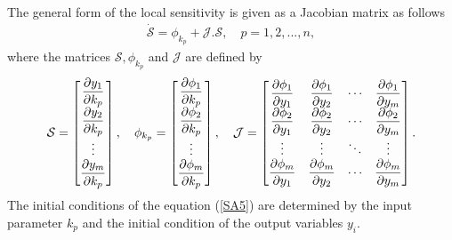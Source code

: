 \documentclass[a4paper,12pt]{article}
\begin{document}
\noindent The general form of the local sensitivity is given as a Jacobian matrix as follows
\begin{equation}  
\begin{array}{llll}
\dot{\mathcal{S}}=\phi_{k_{p}}+\mathcal{J} . \mathcal{S}, \quad p=1,2,...,n,
\end{array}\label{SA5}
\end{equation}
\noindent where the matrices $\mathcal{S}, \phi_{k_{p}}$ and $\mathcal{J}$ are defined by  
\begin{gather*}
  \setlength{\arraycolsep}{1\arraycolsep}
  \text{$
 \mathcal{S}
=\begin{bmatrix}
\frac{\partial y_{1}}{\partial k_{p}}\\
\frac{\partial y_{2}}{\partial k_{p}}\\
\vdots \\
 \frac{\partial y_{m}}{\partial k_{p}}\\
\end{bmatrix}, 
 \quad \phi_{k_{p}}  =\begin{bmatrix}
\frac{\partial \phi_{1}}{\partial k_{p}} \\
\frac{\partial \phi_{2}}{\partial k_{p}} \\
\vdots \\
\frac{\partial \phi_{m}}{\partial k_{p}} 
\end{bmatrix}
, \quad \mathcal{J}=  \begin{bmatrix}
   \frac{\partial \phi_{1}}{\partial y_{1}} & \frac{\partial \phi_{1}}{\partial y_{2}} & \cdots &  \frac{\partial \phi_{1}}{\partial y_{m}}   \\  
  \frac{\partial \phi_{2}}{\partial y_{1}} & \frac{\partial \phi_{2}}{\partial y_{2}} & \cdots &  \frac{\partial \phi_{2}}{\partial y_{m}}   \\ 
  \vdots & \vdots & \ddots & \vdots \\
   \frac{\partial \phi_{m}}{\partial y_{1}} & \frac{\partial \phi_{m}}{\partial y_{2}} & \cdots &  \frac{\partial \phi_{m}}{\partial y_{m}}  \\      
    \end{bmatrix} .   
$}        
\end{gather*}
\noindent The initial conditions of the equation (\ref{SA5}) are determined by the input parameter $k_{p}$ and the initial condition of the output variables $y_{i}$.\\
\end{document}
